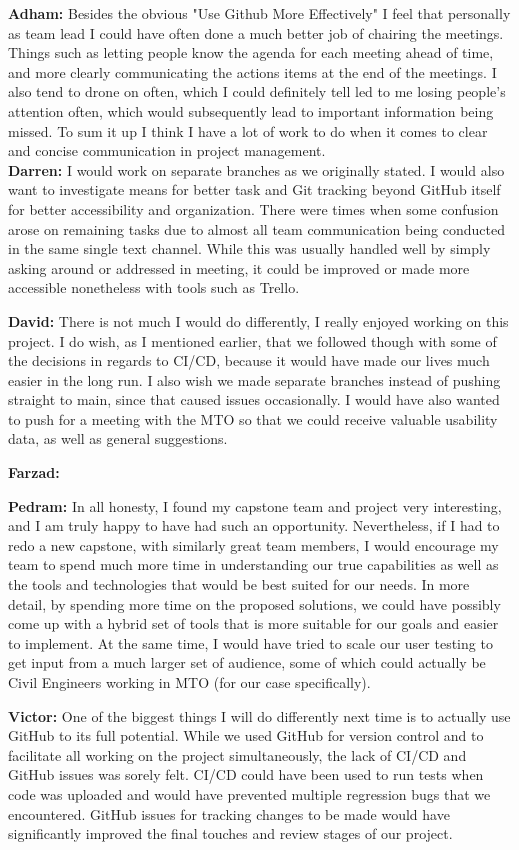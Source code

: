 \documentclass{article}
\begin{document}
\textbf{Adham:} Besides the obvious "Use Github More Effectively" I feel that personally as team lead I could have often done a much better job of chairing the meetings. Things
such as letting people know the agenda for each meeting ahead of time, and more clearly communicating the actions items at the end of the meetings. I also tend to drone on 
often, which I could definitely tell led to me losing people's attention often, which would subsequently lead to important information being missed. To sum it up I think I have
a lot of work to do when it comes to clear and concise communication in project management.\\

\textbf{Darren:} I would work on separate branches as we originally stated. I would also want to investigate means for better task and Git tracking beyond GitHub itself for better accessibility and organization. There were times when some confusion arose on remaining tasks due to almost all team communication being conducted in the same single text channel. While this was usually handled well by simply asking around or addressed in meeting, it could be improved or made more accessible nonetheless with tools such as Trello.

\textbf{David:} There is not much I would do differently, I really enjoyed working on this project. I do wish, as I mentioned earlier, that we followed though with some of the decisions in regards to CI/CD, because it would have made our lives much easier in the long run. I also wish we made separate branches instead of pushing straight to main, since that caused issues occasionally. I would have also wanted to push for a meeting with the MTO so that we could receive valuable usability data, as well as general suggestions.

\textbf{Farzad:}

\textbf{Pedram:} In all honesty, I found my capstone team and project very interesting, and I am truly happy to have had such an opportunity. Nevertheless, if I had to redo a new capstone, with similarly great team members, I would encourage my team to spend much more time in understanding our true capabilities as well as the tools and technologies that would be best suited for our needs. In more detail, by spending more time on the proposed solutions, we could have possibly come up with a hybrid set of tools that is more suitable for our goals and easier to implement. At the same time, I would have tried to scale our user testing to get input from a much larger set of audience, some of which could actually be Civil Engineers working in MTO (for our case specifically). 

\textbf{Victor:} One of the biggest things I will do differently next time is to actually use GitHub to its full potential. While we used GitHub for version control and to 
facilitate all working on the project simultaneously, the lack of CI/CD and GitHub issues was sorely felt. CI/CD could have been used to run tests when code was uploaded and 
would have prevented multiple regression bugs that we encountered. GitHub issues for tracking changes to be made would have significantly improved the final touches and review 
stages of our project.
\end{document}
